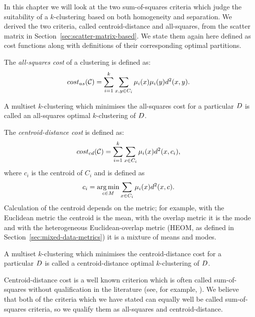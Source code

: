 In this chapter we will look at the two sum-of-squares criteria which judge
the suitability of a $k$-clustering based on both homogeneity and separation.
We derived the two criteria, called centroid-distance and all-squares, from
the scatter matrix in Section~\ref{sec:scatter-matrix-based}.  We state them
again here defined as cost functions along with definitions of their
corresponding optimal partitions.

The \textit{all-squares cost} of a clustering is defined as:
\begin{equation}
  \label{eq:ASC}
  cost_{as}(\mathcal{C}) = \sum_{i=1}^{k} \sum_{x,y \in C_i} \mu_i(x) \mu_i(y) d^2(x,y).
\end{equation}

\begin{dfn}
  A multiset $k$-clustering which minimises the all-squares cost for a
  particular $D$ is called an all-squares optimal $k$-clustering of
  $D$.
\end{dfn}

The \textit{centroid-distance cost} is defined as:
\begin{equation}
  \label{eq:CDC}
  cost_{cd}(\mathcal{C}) = \sum_{i=1}^{k} \sum_{x \in C_i} \mu_i(x) d^2(x,c_i),
\end{equation}
where $c_i$ is the centroid of $C_i$ and is defined as
\begin{equation*}
  c_i = \operatorname*{arg\,min}_{c \in M} \sum_{x \in C_i} \mu_i(x) d^2(x,c).
\end{equation*}
Calculation of the centroid depends on the metric; for example, with the
Euclidean metric the centroid is the mean, with the overlap metric it is the
mode and with the heterogeneous Euclidean-overlap metric (HEOM, as defined in
Section~\ref{sec:mixed-data-metrics}) it is a mixture of means and modes.

\begin{dfn}
  A multiset $k$-clustering which minimises the centroid-distance cost for a
  particular $D$ is called a centroid-distance optimal $k$-clustering of
  $D$.
\end{dfn}

Centroid-distance cost is a well known criterion which is often called
sum-of-squares without qualification in the literature (see, for example,
\citep{aloise09,merle1999interior,spath80,jain-1999,hansen1997mathprog}).  We
believe that both of the criteria which we have stated can equally well be
called sum-of-squares criteria, so we qualify them as all-squares and
centroid-distance.

